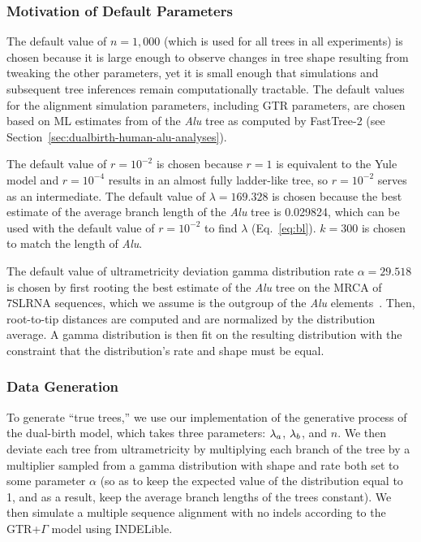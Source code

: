 \subsubsection{Motivation of Default Parameters}\label{sup:simsetup-mot}
The default value of $n = 1,000$ (which is used for all trees in all experiments) is chosen because it is large enough to observe changes in tree shape resulting from tweaking the other parameters, yet it is small enough that simulations and subsequent tree inferences remain computationally tractable. The default values for the alignment simulation parameters, including \gls{GTR} parameters, are chosen based on ML estimates from of the \textit{Alu}  tree as computed by FastTree-2 (see Section~\ref{sec:dualbirth-human-alu-analyses}).

The default value of $r=10^{-2}$ is chosen because $r=1$ is equivalent to the Yule model and $r=10^{-4}$ results in an almost fully ladder-like tree, so $r=10^{-2}$ serves as an intermediate. The default value of $\lambda=169.328$ is chosen because the best estimate of the average branch length of the \textit{Alu} tree is 0.029824, which can be used with the default value of $r=10^{-2}$ to find $\lambda$ (Eq.~\ref{eq:bl}). $k=300$ is chosen to match the length of \textit{Alu}.

The default value of ultrametricity deviation gamma distribution rate $\alpha=29.518$ is chosen by first rooting the best estimate of the \textit{Alu} tree on the MRCA of 7SLRNA sequences, which we assume is the outgroup of the \textit{Alu} elements~\cite{Deininger2011}. Then, root-to-tip distances are computed and are normalized by the distribution average. A gamma distribution is then fit on the resulting distribution with the constraint that the distribution's rate and shape must be equal.

\subsubsection{Data Generation}
To generate ``true trees,'' we use our implementation of the generative process of the dual-birth model, which takes three parameters: $\lambda_a$, $\lambda_b$, and $n$. We then deviate each tree from ultrametricity by multiplying each branch of the tree by a multiplier sampled from a gamma distribution with shape and rate both set to some parameter $\alpha$ (so as to keep the expected value of the distribution equal to 1, and as a result, keep the average branch lengths of the trees constant). We then simulate a multiple sequence alignment with no indels according to the \gls{GTR}+$\Gamma$ model using INDELible.


